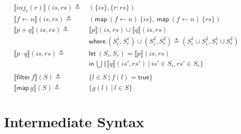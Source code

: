 \documentclass[12pt, letterpaper]{article}
\newcommand\interp[1]{\llbracket #1 \rrbracket}
\begin{document}
\begin{align*}
      \\
    \interp { inj_{r}(r) }(\mathit{is}, \mathit{rs})
      \triangleq\ &
      (\{\mathit{is}\},\{ \mathit{r : rs}\})
      \\
    \interp { f \leftarrow n }(is, rs)
      \triangleq\ &
      (\mathsf{map}\ (f\leftarrow n)\ \{is\},\
       \mathsf{map}\ (f\leftarrow n)\ \{rs\})
      \\ %
    \interp { p + q }(\mathit{is}, \mathit{rs})
      \triangleq\ &
      \interp { p }(\mathit{is}, \mathit{rs})\cup
      \interp { q }(\mathit{is}, \mathit{rs}) \\
      &\mathsf{where}\ (S_i^1, S_r^1)\cup (S_i^2, S_r^2)\triangleq
        (S_i^1\cup S_i^2, S_r^1\cup S_r^2)\\
    \interp { p \cdot q }(\mathit{is}, \mathit{rs})
      \triangleq\ &
      \mathsf{let}\ (S_i, S_r) = \interp{p}(is, rs)\\
      &\mathsf{in}\ \bigcup \{\interp{q}(\mathit{is}',\mathit{rs}')\ |\ \mathit{is}'\in S_i, \mathit{rs'}\in S_r\}\\
      \\
    \interp{\mathsf{filter}\ f}(S)
      \triangleq\ & \{l \in S\ |\ f(l) = \mathsf{true}\}\\
    \interp{\mathsf{map}\ g}(S)
      \triangleq\ &
      \{ g(l)\ |\ l\in S \} 
  \end{align*}


\cleardoublepage
\section{Intermediate Syntax}
\end{document}
